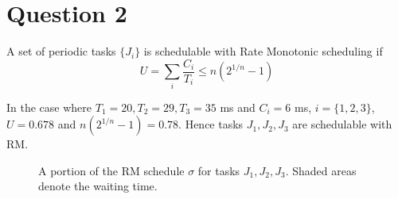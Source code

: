 \section{Question 2}

A set of periodic tasks $\{J_i\}$ is schedulable with Rate Monotonic scheduling
if $$U = \sum_{i} \dfrac{C_i}{T_i} \leq n(2^{1/n} - 1)$$

In the case where $T_1 = 20, T_2 = 29, T_3 = 35$ ms and $C_i = 6$ ms,
$i=\{1,2,3\}$, $U=0.678$ and $n(2^{1/n} - 1) = 0.78$. Hence tasks $J_1, J_2, J_3$
are schedulable with RM.

\begin{figure}[H]\centering
  \scalebox{0.7}{}
  \caption{A portion of the RM schedule $\sigma$ for tasks $J_1, J_2, J_3$.
    Shaded areas denote the waiting time.}
\end{figure}
